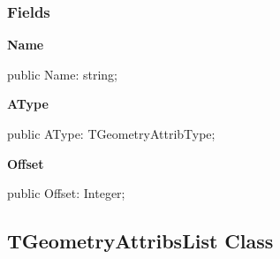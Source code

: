 \documentclass{report}
\newif\ifpdf
\begin{document}
\subsubsection*{\large{\textbf{Fields}}\normalsize\hspace{1ex}\hfill}
\begin{list}{}{
\setlength{\itemindent}{0cm}
\setlength{\listparindent}{0cm}
\setlength{\leftmargin}{\evensidemargin}
\addtolength{\leftmargin}{\tmplength}
\settowidth{\labelsep}{X}
\addtolength{\leftmargin}{\labelsep}
\setlength{\labelwidth}{\tmplength}
}
\label{ok_generic.TGeometryAttrib-Name}
\item[\textbf{Name}\hfill]
\ifpdf
\begin{flushleft}
\fi
\begin{ttfamily}
public Name: string;\end{ttfamily}

\ifpdf
\end{flushleft}
\fi


\par  \label{ok_generic.TGeometryAttrib-AType}
\item[\textbf{AType}\hfill]
\ifpdf
\begin{flushleft}
\fi
\begin{ttfamily}
public AType: TGeometryAttribType;\end{ttfamily}

\ifpdf
\end{flushleft}
\fi


\par  \label{ok_generic.TGeometryAttrib-Offset}
\item[\textbf{Offset}\hfill]
\ifpdf
\begin{flushleft}
\fi
\begin{ttfamily}
public Offset: Integer;\end{ttfamily}

\ifpdf
\end{flushleft}
\fi


\par  \end{list}
\ifpdf
\subsection*{\large{\textbf{TGeometryAttribsList Class}}\normalsize\hspace{1ex}\hrulefill}
\else
\subsection*{TGeometryAttribsList Class}
\fi
\label{ok_generic.TGeometryAttribsList}
\end{document}

